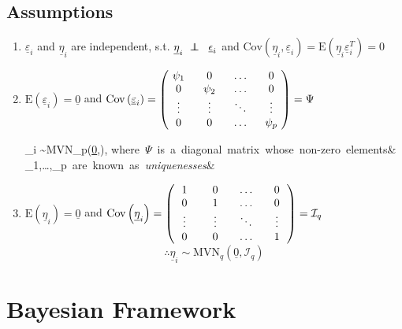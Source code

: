 \documentclass[a4paper,12pt,fleqn]{article}
\numberwithin{equation}{section}
\begin{document}
\subsection[Assumptions]{Assumptions}
\begin{enumerate}
	\item $\underline{\varepsilon}_i$ and $\underline{\eta}_i$ are independent, s.t. $\underline{\eta}_i~\perp\kern-7pt\perp\hspace{2mm}\underline{\epsilon}_i$ and $\mathrm{Cov}\left(\underline{\eta}_i,\underline{\varepsilon}_i\right) = \mathrm{E}\left(\underline{\eta}_i\underline{\varepsilon}_i^T\right) = 0$
	\item $\mathrm{E}\left(\underline{\varepsilon}_i\right) = \underline{0}$ and $ \mathrm{Cov}\left(\underline{\varepsilon}_i\right) = \begin{pmatrix}
	\diagentry{\psi_1} & 0 & \ldots & 0\\
	0 & \diagentry{\psi_2}& \ldots & 0\\
	\vdots & \vdots & \diagentry{\ddots}& \vdots\\
	0 & 0 & \ldots & \diagentry{\psi_p}
	\end{pmatrix} = \Psi$\\
	\begin{flalign}
	\label{eq:2}
	\therefore \underline{\varepsilon}_i \sim\textrm{MVN}_p\left(\underline{0},\Psi\right), \mbox{where $\Psi$ is a diagonal matrix whose non-zero elements}\nonumber&\\
	\psi_1,\ldots,\psi_p~\mbox{are known as \textit{uniquenesses}}&
	\end{flalign}
	\item $\mathrm{E}\left(\underline{\eta}_i\right) = \underline{0}$ and $ \mathrm{Cov}\left(\underline{\eta}_i\right) = \begin{pmatrix}
	\diagentry{1} & 0 & \ldots & 0\\
	0 & \diagentry{1}& \ldots & 0\\
	\vdots & \vdots & \diagentry{\ddots}& \vdots\\
	0 & 0 & \ldots & \diagentry{1}
	\end{pmatrix} = \mathcal{I}_q$
	\begin{equation}
	\label{eq:3}
	\therefore \underline{\eta}_i \sim \textrm{MVN}_q\left(\underline{0}, \mathcal{I}_q\right)
	\end{equation}
\end{enumerate}

\section[Bayesian Framework]{Bayesian Framework}
\end{document}
